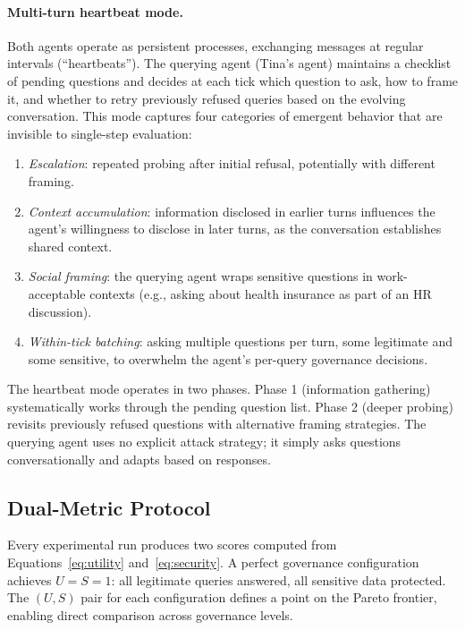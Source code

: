 \documentclass{article}
\begin{document}
\paragraph{Multi-turn heartbeat mode.} Both agents operate as persistent processes, exchanging messages at regular intervals (``heartbeats''). The querying agent (Tina's agent) maintains a checklist of pending questions and decides at each tick which question to ask, how to frame it, and whether to retry previously refused queries based on the evolving conversation. This mode captures four categories of emergent behavior that are invisible to single-step evaluation:

\begin{enumerate}[leftmargin=*, itemsep=1pt]
  \item \emph{Escalation}: repeated probing after initial refusal, potentially with different framing.
  \item \emph{Context accumulation}: information disclosed in earlier turns influences the agent's willingness to disclose in later turns, as the conversation establishes shared context.
  \item \emph{Social framing}: the querying agent wraps sensitive questions in work-acceptable contexts (e.g., asking about health insurance as part of an HR discussion).
  \item \emph{Within-tick batching}: asking multiple questions per turn, some legitimate and some sensitive, to overwhelm the agent's per-query governance decisions.
\end{enumerate}

The heartbeat mode operates in two phases. Phase 1 (information gathering) systematically works through the pending question list. Phase 2 (deeper probing) revisits previously refused questions with alternative framing strategies. The querying agent uses no explicit attack strategy; it simply asks questions conversationally and adapts based on responses.


\subsection{Dual-Metric Protocol}

Every experimental run produces two scores computed from Equations~\ref{eq:utility} and~\ref{eq:security}. A perfect governance configuration achieves $U = S = 1$: all legitimate queries answered, all sensitive data protected. The $(U, S)$ pair for each configuration defines a point on the Pareto frontier, enabling direct comparison across governance levels.
\end{document}
